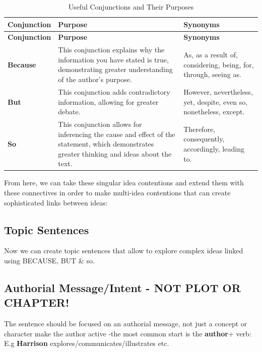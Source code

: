 \documentclass[a4paper]{article}
\begin{document}
\begin{longtable}{|p{2.8cm}|p{6.8cm}|p{5.2cm}|}
\caption{Useful Conjunctions and Their Purposes} \label{tab:conjunctions} \\
\hline
\textbf{Conjunction} & \textbf{Purpose} & \textbf{Synonyms} \\
\hline
\endfirsthead

\hline
\textbf{Conjunction} & \textbf{Purpose} & \textbf{Synonyms} \\
\hline
\endhead

\hline
\endfoot

\textbf{Because} & This conjunction explains why the information you have stated is true, demonstrating greater understanding of the author's purpose. & As, as a result of, considering, being, for, through, seeing as. \\
\hline
\textbf{But} & This conjunction adds contradictory information, allowing for greater debate. & However, nevertheless, yet, despite, even so, nonetheless, except. \\
\hline
\textbf{So} & This conjunction allows for inferencing the cause and effect of the statement, which demonstrates greater thinking and ideas about the text. & Therefore, consequently, accordingly, leading to. \\
\hline

\end{longtable}

From here, we can take these singular idea contentions and extend them with these connectives in order to make multi-idea contentions that can create sophisticated links between ideas:

\subsection{Topic Sentences}
Now we can create topic sentences that allow to explore complex ideas linked using BECAUSE, BUT \&
so.

\subsection{Authorial Message/Intent - NOT PLOT OR CHAPTER!}

The sentence should be focused on an authorial message, not just a concept or character­ make the author active -the most common start is the \textbf{author}+ verb:\\

E.g \textbf{Harrison} explores/communicates/illustrates etc.
\end{document}
